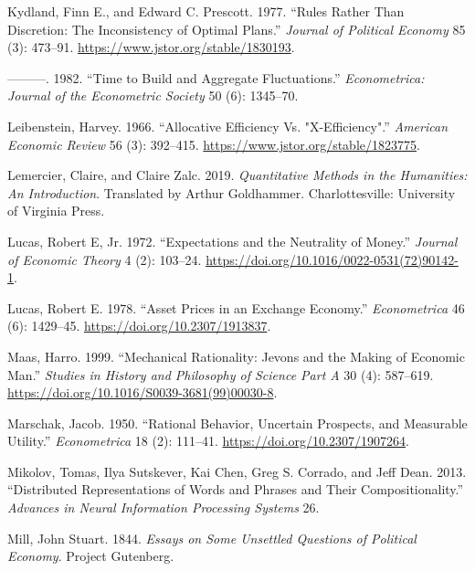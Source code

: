\documentclass[
]{interact}
\newlength{\cslhangindent}
\newenvironment{CSLReferences}[2] %
 {\begin{list}{}{%
  \setlength{\itemindent}{0pt}
  \setlength{\leftmargin}{0pt}
  \setlength{\parsep}{0pt}
  \ifodd #1
   \setlength{\leftmargin}{\cslhangindent}
   \setlength{\itemindent}{-1\cslhangindent}
  \fi
  \setlength{\itemsep}{#2\baselineskip}}}
 {\end{list}}
\begin{document}
\begin{CSLReferences}{1}{0}
Kydland, Finn E., and Edward C. Prescott. 1977. {``Rules {Rather} Than
{Discretion}: {The Inconsistency} of {Optimal Plans}.''} \emph{Journal
of Political Economy} 85 (3): 473--91.
\url{https://www.jstor.org/stable/1830193}.

---------. 1982. {``Time to Build and Aggregate Fluctuations.''}
\emph{Econometrica: Journal of the Econometric Society} 50 (6):
1345--70.

Leibenstein, Harvey. 1966. {``Allocative {Efficiency} Vs.
"{X-Efficiency}".''} \emph{American Economic Review} 56 (3): 392--415.
\url{https://www.jstor.org/stable/1823775}.

Lemercier, Claire, and Claire Zalc. 2019. \emph{Quantitative Methods in
the Humanities: An Introduction}. Translated by Arthur Goldhammer.
Charlottesville: University of Virginia Press.

Lucas, Robert E, Jr. 1972. {``Expectations and the Neutrality of
Money.''} \emph{Journal of Economic Theory} 4 (2): 103--24.
\url{https://doi.org/10.1016/0022-0531(72)90142-1}.

Lucas, Robert E. 1978. {``Asset {Prices} in an {Exchange Economy}.''}
\emph{Econometrica} 46 (6): 1429--45.
\url{https://doi.org/10.2307/1913837}.

Maas, Harro. 1999. {``Mechanical {Rationality}: {Jevons} and the
{Making} of {Economic Man}.''} \emph{Studies in History and Philosophy
of Science Part A} 30 (4): 587--619.
\url{https://doi.org/10.1016/S0039-3681(99)00030-8}.

Marschak, Jacob. 1950. {``Rational {Behavior}, {Uncertain Prospects},
and {Measurable Utility}.''} \emph{Econometrica} 18 (2): 111--41.
\url{https://doi.org/10.2307/1907264}.

Mikolov, Tomas, Ilya Sutskever, Kai Chen, Greg S. Corrado, and Jeff
Dean. 2013. {``Distributed Representations of Words and Phrases and
Their Compositionality.''} \emph{Advances in Neural Information
Processing Systems} 26.

Mill, John Stuart. 1844. \emph{Essays on {Some Unsettled Questions} of
{Political Economy}}. Project Gutenberg.


\end{CSLReferences}
\end{document}

